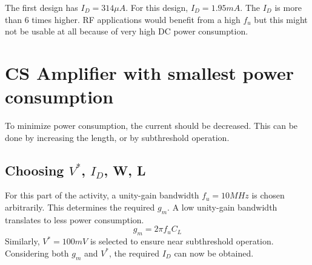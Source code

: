 \documentclass[conference]{IEEEtran}
\begin{document}
\vspace{8pt}
The first design has $I_D = 314\mu A$. For this design, $I_D=1.95mA$. The $I_D$ is more than 6 times higher. RF applications would benefit from a high $f_u$ but this might not be usable at all because of very high DC power consumption. 

\vspace{8pt}
\section{CS Amplifier with smallest power consumption}
To minimize power consumption, the current should be decreased. This can be done by increasing the length, or by subthreshold operation. 

\subsection{Choosing $V^*$, $I_{D}$, W, L}
For this part of the activity, a unity-gain bandwidth $f_u = 10MHz$ is chosen arbitrarily. This determines the required $g_m$. A low unity-gain bandwidth translates to less power consumption. 
\begin{equation*}
	g_m = 2\pi f_u C_L
\end{equation*}
Similarly, $V^* = 100mV$ is selected to ensure near subthreshold operation. Considering both $g_m$ and $V^*$, the required $I_D$ can now be obtained. 
\end{document}
